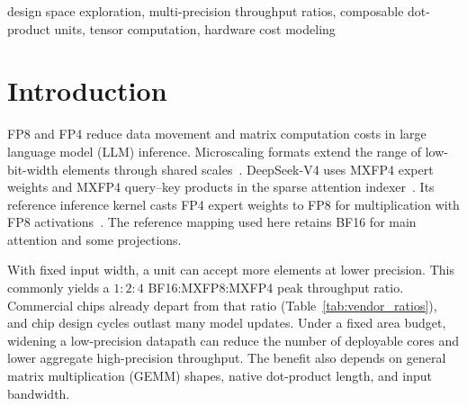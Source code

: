 \documentclass[conference,9pt,letterpaper]{IEEEtran}
\title{\PaperTitle}
\author{\IEEEauthorblockN{Anonymous Submission}}
\begin{document}
\maketitle

\begin{abstract}
Microscaling formats such as MXFP8 and MXFP4 increase demand for low-precision throughput in tensor cores. DP-Puzzle explores how to provision that throughput under a fixed area budget. Composable dot-product units share arithmetic across precisions and add specialized groups to realize different peak throughput ratios. We combine post-synthesis area and power estimates with mixed-precision workload models. Quadrupling FP4 throughput requires $1.84\times$ the baseline unit area. In an equal-area comparison of four ratios, $1:4:8$ minimizes compute time and active energy at the sampled DeepSeek points with 4-bit expert weights and 8-bit activations. Some long-context scenarios with 4-bit activations favor $1:2:8$.
\end{abstract}
\begin{IEEEkeywords}
design space exploration, multi-precision throughput ratios, composable dot-product units, tensor computation, hardware cost modeling
\end{IEEEkeywords}

\section{Introduction}
\label{sec:introduction}

FP8 and FP4 reduce data movement and matrix computation costs in large language model (LLM) inference. Microscaling formats extend the range of low-bit-width elements through shared scales~\cite{ocpmx2023,nvidia2024nvfp4,hifloat4}. DeepSeek-V4 uses MXFP4 expert weights and MXFP4 query--key products in the sparse attention indexer~\cite{deepseekv4}. Its reference inference kernel casts FP4 expert weights to FP8 for multiplication with FP8 activations~\cite{deepseekv4flashsource}. The reference mapping used here retains BF16 for main attention and some projections.

With fixed input width, a unit can accept more elements at lower precision. This commonly yields a $1:2:4$ BF16:MXFP8:MXFP4 peak throughput ratio. Commercial chips already depart from that ratio (Table~\ref{tab:vendor_ratios}), and chip design cycles outlast many model updates. Under a fixed area budget, widening a low-precision datapath can reduce the number of deployable cores and lower aggregate high-precision throughput. The benefit also depends on general matrix multiplication (GEMM) shapes, native dot-product length, and input bandwidth.
\end{document}

